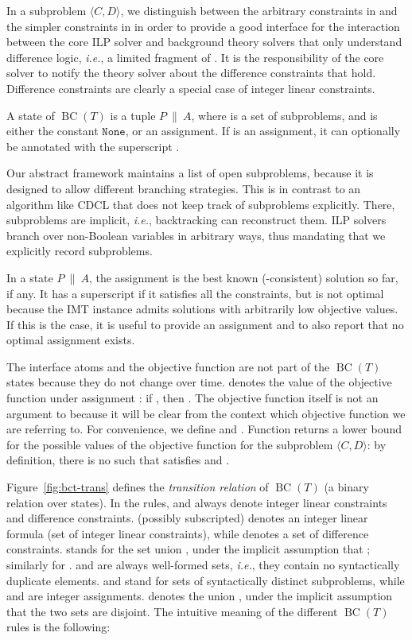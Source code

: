 \documentclass{llncs}
\newcommand{\comment}[1]{}
\newcommand{\ie}[0]{\emph{i.e.}, }
\newcommand\none[0]{\ensuremath{\mathtt{None}}}
\newcommand{\state}[2]{\ensuremath{#1\ \|\ #2}}
\newcommand{\subp}[2]{\ensuremath{\langle#1, #2\rangle}}
\newcommand{\cd}{\subp{C}{D}}
\newcommand{\pa}{\state{P}{A}}
\newcommand{\bct}[0]{\ensuremath{\operatorname{BC}(T)}}
\begin{document}
In a subproblem \cd{}, we distinguish between the arbitrary
constraints in  and the simpler constraints in  in order to
provide a good interface for the interaction between the core ILP
solver and background theory solvers that only understand difference
logic, \ie a limited fragment of . It is the responsibility of the
core solver to notify the theory solver about the difference
constraints that hold. Difference constraints are clearly a special
case of integer linear constraints.

\begin{definition}[State]
  A state of \bct{} is a tuple {\pa}, where  is a set of
  subproblems, and  is either the constant \none, or an assignment.
  If  is an assignment, it can optionally be annotated with the
  superscript .
\end{definition}

Our abstract framework maintains a list of open subproblems, because
it is designed to allow different branching strategies. This is in
contrast to an algorithm like CDCL that does not keep track of
subproblems explicitly. There, subproblems are implicit, \ie
backtracking can reconstruct them. ILP solvers branch over non-Boolean
variables in arbitrary ways, thus mandating that we explicitly record
subproblems.

In a state \pa{}, the assignment  is the best known
(-consistent) solution so far, if any. It has a superscript
 if it satisfies all the constraints, but is not optimal
because the IMT instance admits solutions with arbitrarily low
objective values. If this is the case, it is useful to provide an
assignment and to also report that no optimal assignment exists.

The interface atoms  and the objective function  are not part of
the \bct{} states because they do not change over time.  
denotes the value of the objective function  under assignment :
if , then . The
objective function itself is not an argument to
 because it will be clear from the
context which objective function we are referring to. For convenience,
we define  and . Function  returns a lower bound for the possible
values of the objective function  for the subproblem \cd{}: by
definition, there is no  such that  satisfies  and
.

Figure~\ref{fig:bct-trans} defines the \emph{transition relation}
 of \bct{} (a binary relation over states). In the
rules,  and  always denote integer linear constraints and
difference constraints.  (possibly subscripted) denotes an integer
linear formula (set of integer linear constraints), while  denotes
a set of difference constraints.  stands for the set union , under the implicit assumption that ;
similarly for .  and  are always well-formed sets, \ie
they contain no syntactically duplicate elements.  and  stand
for sets of syntactically distinct subproblems, while  and  are
integer assignments.   denotes the union , under
the implicit assumption that the two sets are disjoint. \comment{
  stands for a -formula, where  is
  the signature of .} The intuitive meaning of the different \bct{}
rules is the following:
\end{document}
